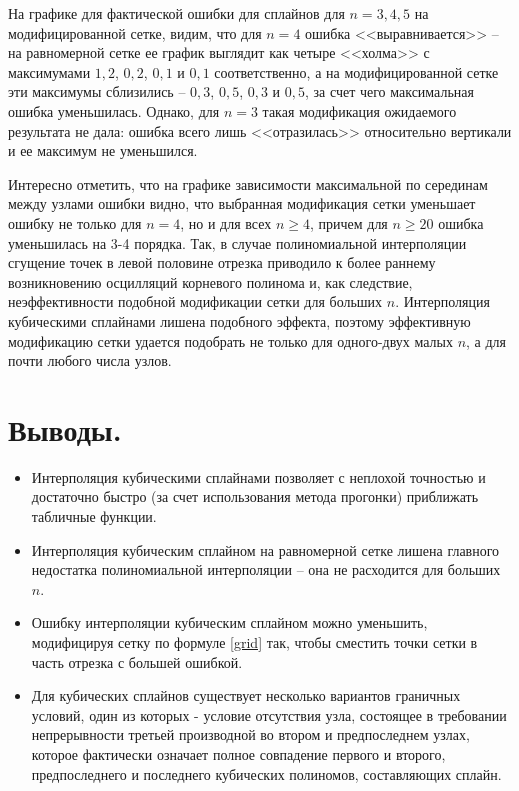 \documentclass[a4paper, 12pt]{article}
\begin{document}
	На графике для фактической ошибки для сплайнов для $n=3,4,5$ на модифицированной сетке, видим, что для $n=4$ ошибка <<выравнивается>> -- на равномерной сетке ее график выглядит как четыре <<холма>> с максимумами $1,2$, $0,2$, $0,1$ и $0,1$ соответственно, а на модифицированной сетке эти максимумы сблизились -- $0,3$, $0,5$, $0,3$ и $0,5$, за счет чего максимальная ошибка уменьшилась. Однако, для $n=3$ такая модификация ожидаемого результата не дала: ошибка всего лишь <<отразилась>> относительно вертикали и ее максимум не уменьшился.
	
	Интересно отметить, что на графике зависимости максимальной по серединам между узлами ошибки видно, что выбранная модификация сетки уменьшает ошибку не только для $n=4$, но и для всех $n\geq 4$, причем для $n\geq20$ ошибка уменьшилась на 3-4 порядка. Так, в случае полиномиальной интерполяции сгущение точек в левой половине отрезка приводило к более раннему возникновению осцилляций корневого полинома и, как следствие, неэффективности подобной модификации сетки для больших $n$. Интерполяция кубическими сплайнами лишена подобного эффекта, поэтому эффективную модификацию сетки удается подобрать не только для одного-двух малых $n$, а для почти любого числа узлов.
	
	\section{Выводы.}
	
	\begin{itemize}
		\item Интерполяция кубическими сплайнами позволяет с неплохой точностью и достаточно быстро (за счет использования метода прогонки) приближать табличные функции.
		\item Интерполяция кубическим сплайном на равномерной сетке лишена главного недостатка полиномиальной интерполяции -- она не расходится для больших $n$.
		\item Ошибку интерполяции кубическим сплайном можно уменьшить, модифицируя сетку по формуле \eqref{grid} так, чтобы сместить точки сетки в часть отрезка с большей ошибкой.
		\item Для кубических сплайнов существует несколько вариантов граничных условий, один из которых - условие отсутствия узла, состоящее в требовании непрерывности третьей производной во втором и предпоследнем узлах, которое фактически означает полное совпадение первого и второго, предпоследнего и последнего кубических полиномов, составляющих сплайн.
	\end{itemize}
	
\end{document}
